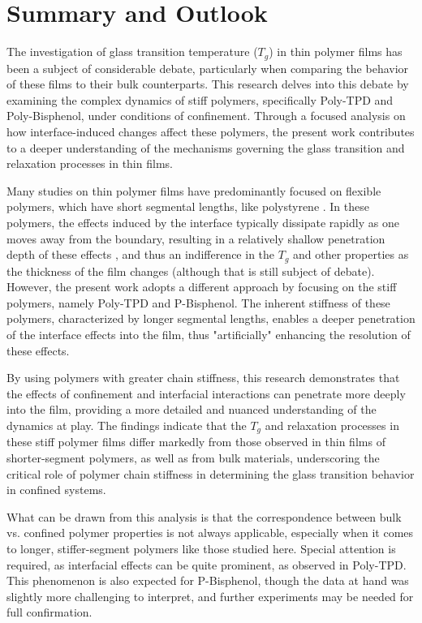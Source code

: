 \clearpage


\chapter{Summary and Outlook}

The investigation of glass transition temperature (\(T_g\)) in thin polymer films has been a subject of considerable debate, particularly when comparing the behavior of these films to their bulk counterparts. This research delves into this debate by examining the complex dynamics of stiff polymers, specifically Poly-TPD and Poly-Bisphenol, under conditions of confinement. Through a focused analysis on how interface-induced changes affect these polymers, the present work contributes to a deeper understanding of the mechanisms governing the glass transition and relaxation processes in thin films.

Many studies on thin polymer films have predominantly focused on flexible polymers, which have short segmental lengths, like polystyrene \cite{INOUE2006367}. In these polymers, the effects induced by the interface typically dissipate rapidly as one moves away from the boundary, resulting in a relatively shallow penetration depth of these effects \cite{winkler2021}, and thus an indifference in the \(T_g\) and other properties as the thickness of the film changes (although that is still subject of debate). However, the present work adopts a different approach by focusing on the stiff polymers, namely Poly-TPD and P-Bisphenol. The inherent stiffness of these polymers, characterized by longer segmental lengths, enables a deeper penetration of the interface effects into the film, thus "artificially" enhancing the resolution of these effects.

By using polymers with greater chain stiffness, this research demonstrates that the effects of confinement and interfacial interactions can penetrate more deeply into the film, providing a more detailed and nuanced understanding of the dynamics at play. The findings indicate that the \(T_g\) and relaxation processes in these stiff polymer films differ markedly from those observed in thin films of shorter-segment polymers, as well as from bulk materials, underscoring the critical role of polymer chain stiffness in determining the glass transition behavior in confined systems.

What can be drawn from this analysis is that the correspondence between bulk vs. confined polymer properties is not always applicable, especially when it comes to longer, stiffer-segment polymers like those studied here. Special attention is required, as interfacial effects can be quite prominent, as observed in Poly-TPD. This phenomenon is also expected for P-Bisphenol, though the data at hand was slightly more challenging to interpret, and further experiments may be needed for full confirmation.

